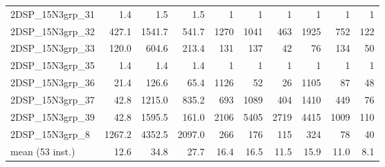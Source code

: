 \documentclass[a4paper,10pt]{article}
\theoremstyle{definition}
\begin{document}
\begin{table}[t]
\begin{scriptsize}
\begin{tabular*}{\textwidth}{@{}l@{\;\;\extracolsep{\fill}}rrrrrrrrr@{}}
 2DSP\_15N3grp\_31 & \num{   1.4} & \num{   1.5} & \num{   1.5} & \num{         1} & \num{         1} & \num{         1} & \num{         1} & \num{         1} & \num{         1}\\
 2DSP\_15N3grp\_32 & \num{ 427.1} & \num{1541.7} & \num{ 541.7} & \num{      1270} & \num{      1041} & \num{       463} & \num{      1925} & \num{       752} & \num{       122}\\
 2DSP\_15N3grp\_33 & \num{ 120.0} & \num{ 604.6} & \num{ 213.4} & \num{       131} & \num{       137} & \num{        42} & \num{        76} & \num{       134} & \num{        50}\\
 2DSP\_15N3grp\_35 & \num{   1.4} & \num{   1.4} & \num{   1.4} & \num{         1} & \num{         1} & \num{         1} & \num{         1} & \num{         1} & \num{         1}\\
 2DSP\_15N3grp\_36 & \num{  21.4} & \num{ 126.6} & \num{  65.4} & \num{      1126} & \num{        52} & \num{        26} & \num{      1105} & \num{        87} & \num{        48}\\
 2DSP\_15N3grp\_37 & \num{  42.8} & \num{1215.0} & \num{ 835.2} & \num{       693} & \num{      1089} & \num{       404} & \num{      1410} & \num{       449} & \num{        76}\\
 2DSP\_15N3grp\_39 & \num{  42.8} & \num{1595.5} & \num{ 161.0} & \num{      2106} & \num{      5405} & \num{      2719} & \num{      4415} & \num{      1009} & \num{       110}\\
  2DSP\_15N3grp\_8 & \num{1267.2} & \num{4352.5} & \num{2097.0} & \num{       266} & \num{       176} & \num{       115} & \num{       324} & \num{        78} & \num{        40}\\
\midrule
mean (53 inst.) & \num{  12.6} & \num{  34.8} & \num{  27.7} & \num{      16.4} & \num{      16.5} & \num{      11.5} & \num{      15.9} & \num{      11.0} & \num{       8.1}\\
    \bottomrule
  \end{tabular*}
  \end{scriptsize}
\end{table}
\end{document}
